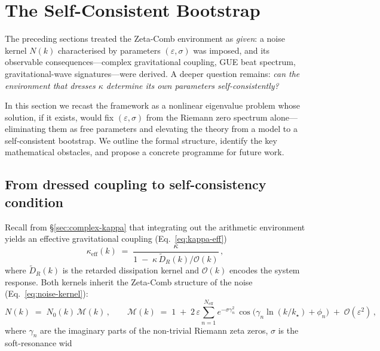 \documentclass[12pt,a4paper]{article}
\begin{document}
\section{The Self-Consistent Bootstrap}
\label{sec:bootstrap}

The preceding sections treated the Zeta-Comb environment as \emph{given}:
a noise kernel $N(k)$ characterised by parameters $(\varepsilon,\sigma)$
was imposed, and its observable consequences---complex gravitational
coupling, GUE beat spectrum, gravitational-wave signatures---were derived.
A deeper question remains: \emph{can the environment that dresses $\kappa$
determine its own parameters self-consistently?}

In this section we recast the framework as a nonlinear eigenvalue problem
whose solution, if it exists, would fix $(\varepsilon,\sigma)$ from the
Riemann zero spectrum alone---eliminating them as free parameters and
elevating the theory from a model to a self-consistent bootstrap.
We outline the formal structure, identify the key mathematical obstacles,
and propose a concrete programme for future work.


\subsection{From dressed coupling to self-consistency condition}
\label{subsec:dressing-selfconsistency}

Recall from \S\ref{sec:complex-kappa} that integrating out the
arithmetic environment yields an effective gravitational coupling
(Eq.~\eqref{eq:kappa-eff})
%
\begin{equation}
  \kappa_{\mathrm{eff}}(k)
  \;=\;
  \frac{\kappa}
       {1 \;-\; \kappa\,\widetilde{D}_{R}(k)\big/\mathcal{O}(k)}\,,
  \label{eq:kappa-eff-recall}
\end{equation}
%
where $\widetilde{D}_{R}(k)$ is the retarded dissipation kernel and
$\mathcal{O}(k)$ encodes the system response.
Both kernels inherit the Zeta-Comb structure of the noise
(Eq.~\eqref{eq:noise-kernel}):
%
\begin{equation}
  N(k)
  \;=\;
  N_{0}(k)\,\mathcal{M}(k)\,,
  \qquad
  \mathcal{M}(k)
  \;=\;
  1 \;+\; 2\,\varepsilon\!\sum_{n=1}^{N_{\mathrm{eff}}}
          e^{-\sigma\gamma_{n}^{2}}\,
          \cos\!\bigl(\gamma_{n}\ln(k/k_{\star})+\phi_{n}\bigr)
  \;+\; \mathcal{O}(\varepsilon^{2})\,,
  \label{eq:modulation-recall}
\end{equation}
%
where $\gamma_{n}$ are the imaginary parts of the non-trivial Riemann
zeta zeros, $\sigma$ is the soft-resonance wid%
\end{document}
